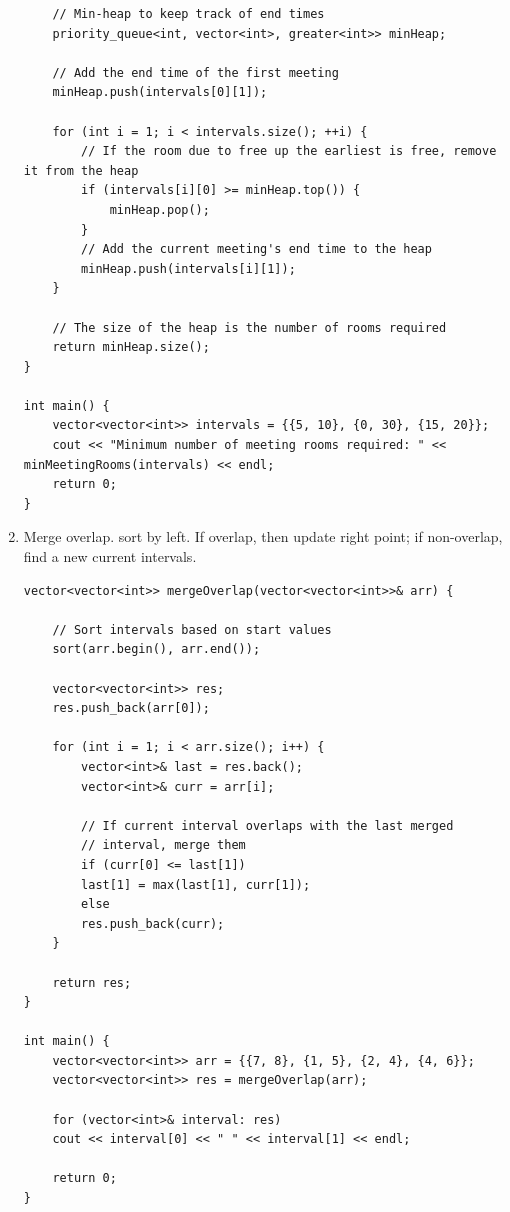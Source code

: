 \documentclass[a4paper,11pt,twoside]{book}
\begin{document}
\begin{enumerate}
\begin{lstlisting}
	// Min-heap to keep track of end times
	priority_queue<int, vector<int>, greater<int>> minHeap;
	
	// Add the end time of the first meeting
	minHeap.push(intervals[0][1]);
	
	for (int i = 1; i < intervals.size(); ++i) {
		// If the room due to free up the earliest is free, remove it from the heap
		if (intervals[i][0] >= minHeap.top()) {
			minHeap.pop();
		}
		// Add the current meeting's end time to the heap
		minHeap.push(intervals[i][1]);
	}
	
	// The size of the heap is the number of rooms required
	return minHeap.size();
}

int main() {
	vector<vector<int>> intervals = {{5, 10}, {0, 30}, {15, 20}};
	cout << "Minimum number of meeting rooms required: " << minMeetingRooms(intervals) << endl;
	return 0;
}
\end{lstlisting}
	
	
	\item Merge overlap. sort by left. If overlap, then update right point; if non-overlap, find a new current intervals. 

\begin{lstlisting}
vector<vector<int>> mergeOverlap(vector<vector<int>>& arr) {
	
	// Sort intervals based on start values
	sort(arr.begin(), arr.end());
	
	vector<vector<int>> res;
	res.push_back(arr[0]);
	
	for (int i = 1; i < arr.size(); i++) {
		vector<int>& last = res.back();
		vector<int>& curr = arr[i];
		
		// If current interval overlaps with the last merged
		// interval, merge them 
		if (curr[0] <= last[1]) 
		last[1] = max(last[1], curr[1]);
		else 
		res.push_back(curr);
	}
	
	return res;
}

int main() {
	vector<vector<int>> arr = {{7, 8}, {1, 5}, {2, 4}, {4, 6}};
	vector<vector<int>> res = mergeOverlap(arr);
	
	for (vector<int>& interval: res) 
	cout << interval[0] << " " << interval[1] << endl;
	
	return 0;
}
\end{lstlisting}

\end{enumerate}
	
\end{document}
